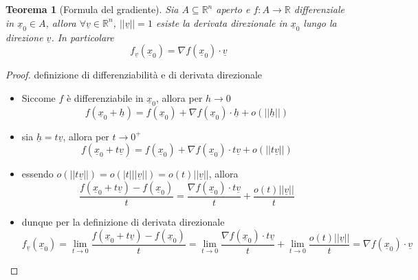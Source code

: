 \documentclass[12pt, a4paper]{article}
\theoremstyle{break}
\newtheorem{theorem}{Teorema} %
\begin{document}
\newpage
\begin{theorem} [Formula del gradiente]
	Sia $A \subseteq \mathbb{R}^n$ aperto e $f: A \to \mathbb{R}$
	differenziale in $\underline{x}_0 \in A$, allora $\forall \underline{v} \in
		\mathbb{R}^n$, $||\underline{v}|| = 1$ esiste la derivata direzionale in
	$\underline{x}_0$ lungo la direzione $\underline{v}$. In particolare
	\[
		f_{\underline{v}}(\underline{x}_0) = \nabla f(\underline{x}_0) \cdot
		\underline{v}
	\]
\end{theorem}
\begin{proof} definizione di differenziabilità e di derivata direzionale
	\begin{itemize}
		\item Siccome $f$ è differenziabile in $\underline{x}_0$, allora per $h
			      \to 0$
		      \[
			      f(\underline{x}_0 + \underline{h}) = f(\underline{x}_0) + \nabla f
			      (\underline{x}_0) \cdot \underline{h}
			      + o(||\underline{h}||)
		      \]
		\item sia $\underline{h} = t \underline{v}$, allora per $t \to 0^+$
		      \[
			      f(\underline{x}_0 + t \underline{v}) = f(\underline{x}_0) +
			      \nabla f (\underline{x}_0) \cdot t \underline{v}
			      + o(||t \underline{v}||)
		      \]
		\item essendo $o(||t \underline{v}||) = o(|t| || \underline{v}||) =
			      o(t)||\underline{v}||$, allora
		      \[
			      \frac{f(\underline{x}_0 + t \underline{v}) -
				      f(\underline{x}_0)}{t} = \frac{\nabla f (\underline{x}_0) \cdot
				      t \underline{v}}{t} + \frac{o(t)||\underline{v}||}{t}
		      \]
		\item dunque per la definizione di derivata direzionale
		      \[
			      f_{\underline{v}}(\underline{x}_0)
			      = \lim_{t \to 0} \frac{f(\underline{x}_0 + t \underline{v}) -
				      f(\underline{x}_0)}{t}
			      = \lim_{t \to 0} \frac{\nabla f (\underline{x}_0) \cdot t
				      \underline{v}}{t} + \lim_{t \to 0}\frac{o(t) ||\underline{v}||}
			      {t} = \nabla f(\underline{x}_0) \cdot \underline{v}
		      \]
	\end{itemize}
\end{proof}
\end{document}
